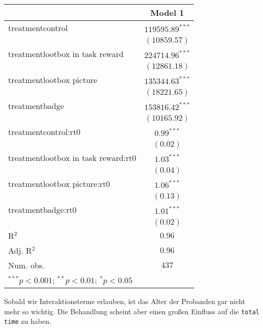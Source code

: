 \documentclass{article}
\begin{document}
\begin{center}
\begin{tabular}{l c}
\hline
 & Model 1 \\
\hline
treatmentcontrol                    & $119595.89^{***}$ \\
                                    & $(10859.57)$      \\
treatmentlootbox in task reward     & $224714.96^{***}$ \\
                                    & $(12861.18)$      \\
treatmentlootbox picture            & $135344.63^{***}$ \\
                                    & $(18221.65)$      \\
treatmentbadge                      & $153816.42^{***}$ \\
                                    & $(10165.92)$      \\
treatmentcontrol:rt0                & $0.99^{***}$      \\
                                    & $(0.02)$          \\
treatmentlootbox in task reward:rt0 & $1.03^{***}$      \\
                                    & $(0.04)$          \\
treatmentlootbox picture:rt0        & $1.06^{***}$      \\
                                    & $(0.13)$          \\
treatmentbadge:rt0                  & $1.01^{***}$      \\
                                    & $(0.02)$          \\
\hline
R$^2$                               & $0.96$            \\
Adj. R$^2$                          & $0.96$            \\
Num. obs.                           & $437$             \\
\hline
\multicolumn{2}{l}{\scriptsize{$^{***}p<0.001$; $^{**}p<0.01$; $^{*}p<0.05$}}
\end{tabular}
\end{center}
Sobald wir Interaktionsterme erlauben, ist das Alter der Probanden gar nicht mehr so wichtig. Die Behandlung scheint aber einen großen Einfluss auf die \texttt{total time} zu haben.
	
\end{document}
